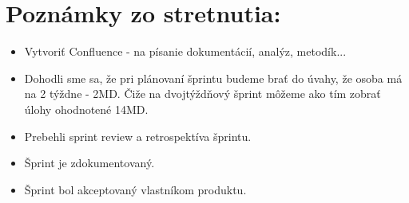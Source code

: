 \documentclass{article}
\begin{document}
    \section*{Poznámky zo stretnutia:}

    \begin{itemize}
        \item Vytvoriť Confluence - na písanie dokumentácií, analýz, metodík... 
        \item Dohodli sme sa, že pri plánovaní šprintu budeme brať do úvahy, že osoba má na 2 týždne - 2MD. Čiže na dvojtýždňový šprint môžeme ako tím zobrať úlohy ohodnotené 14MD.
        \item Prebehli sprint review a retrospektíva šprintu.
        \item Šprint je zdokumentovaný.
        \item Šprint bol akceptovaný vlastníkom produktu.
    \end{itemize}
\end{document}
